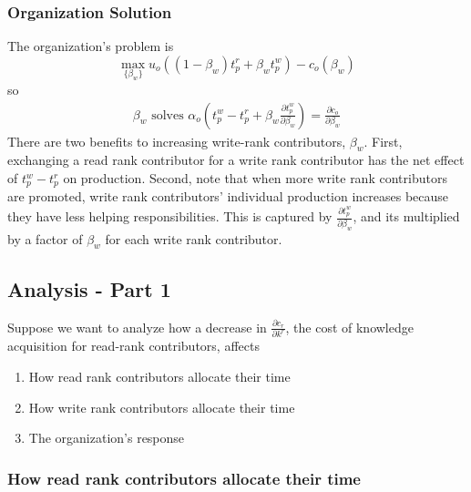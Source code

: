 \documentclass[source/paper/main.tex]{subfiles}
\begin{document}
\subsubsection{Organization Solution}
The organization's problem is 
$$\max_{\{\beta_w\}} u_o\left((1-\beta_w) t_p^r + \beta_w t_p^w\right) - c_o(\beta_w)$$ 
so 
\begin{align}
    \beta_w \text{ solves } \alpha_o(t_p^w- t_p^r + \beta_w \frac{\partial t_p^w}{\partial \beta_w} ) = \frac{\partial c_o}{\partial \beta_w} \label{org_solution}
\end{align}
There are two benefits to increasing write-rank contributors, $\beta_w$. First, exchanging a read rank contributor for a write rank contributor has the net effect of $t_p^w - t_p^r$ on production. Second, note that when more write rank contributors are promoted, write rank contributors' individual production increases because they have less helping responsibilities. This is captured by $\frac{\partial t_p^w}{\partial \beta_w}$, and its multiplied by a factor of $\beta_w$ for each write rank contributor. 

\subsection{Analysis - Part 1}
Suppose we want to analyze how a decrease in $\frac{\partial c_r}{\partial k^r}$, the cost of knowledge acquisition for read-rank contributors, affects
\begin{enumerate}
    \item How read rank contributors allocate their time
    \item How write rank contributors allocate their time
    \item The organization's response
\end{enumerate}
\subsubsection{How read rank contributors allocate their time}
\end{document}
